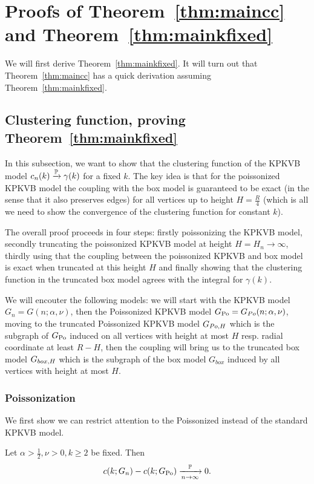 


\section{Proofs of Theorem~\ref{thm:maincc} and Theorem~\ref{thm:mainkfixed}\label{sec:proofs_fixed_k}}


We will first derive Theorem~\ref{thm:mainkfixed}. It will turn out that Theorem~\ref{thm:maincc} has a quick derivation
assuming Theorem~\ref{thm:mainkfixed}.

\subsection{Clustering function, proving Theorem~\ref{thm:mainkfixed}}
In this subsection, we want to show that the clustering function of the KPKVB model $c_n(k) \xrightarrow{\mathbb{P}} \gamma(k)$ for a fixed $k$. The key idea is that for the poissonized KPKVB model the coupling with the box model is guaranteed to be exact (in the sense that it also preserves edges) for all vertices up to height $H = \frac{R}{4}$ (which is all we need to show the convergence of the clustering function for constant $k$).

The overall proof proceeds in four steps: firstly poissonizing the KPKVB model, secondly truncating the poissonized KPKVB model at height $H=H_n \rightarrow \infty$, thirdly using that the coupling between the poissonized KPKVB and box model is exact when truncated at this height $H$ and finally showing that the clustering function in the truncated box model agrees with the integral for $\gamma(k)$.

We will encouter the following models: we will start with the KPKVB model $G_n = G(n;\alpha,\nu)$, then the Poissonized KPKVB model $G_{\text{Po}}  = G_{Po}(n;\alpha,\nu)$, moving to the truncated Poissonized KPKVB model $G_{Po,H}$ which is the subgraph of $G_{\text{Po}}$ induced on all vertices with height at most $H$ resp. radial coordinate at least $R-H$, then the coupling will bring us to the truncated box model $G_{box,H}$ which is the subgraph of the box model $G_{box}$ induced by all vertices with height at most $H$.

\subsubsection{Poissonization}
We first show we can restrict attention to the Poissonized instead of the standard KPKVB model.

\begin{lemma}\label{lem:pok} Let $\alpha>\frac12,\nu>0, k\geq 2$ be fixed. %
Then 
$$ c(k; G_n)-c(k; G_{\text{Po}}) \xrightarrow[n\to\infty]{\mathbb{P}} 0. $$
\end{lemma}

